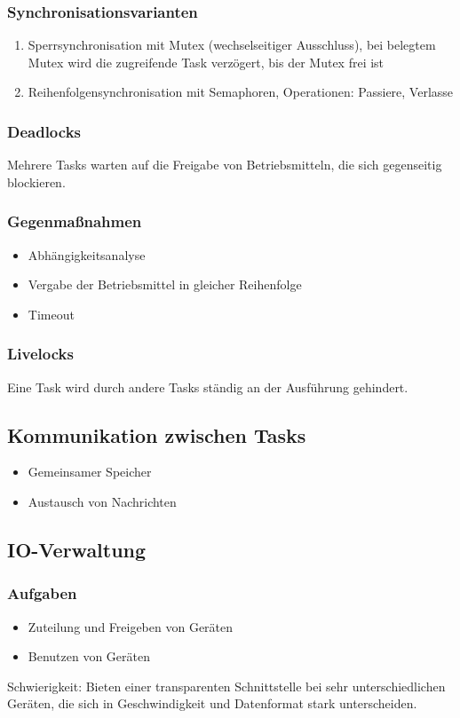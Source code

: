 \subsubsection{Synchronisationsvarianten}
\begin{enumerate}
	\item Sperrsynchronisation mit Mutex (wechselseitiger Ausschluss), bei belegtem Mutex wird die zugreifende Task verzögert, bis der Mutex frei ist
	\item Reihenfolgensynchronisation mit Semaphoren, Operationen: Passiere, Verlasse
\end{enumerate}

\subsubsection{Deadlocks}
Mehrere Tasks warten auf die Freigabe von Betriebsmitteln, die sich gegenseitig blockieren.

\subsubsection{Gegenmaßnahmen}
\begin{itemize}
	\item Abhängigkeitsanalyse
	\item Vergabe der Betriebsmittel in gleicher Reihenfolge
	\item Timeout
\end{itemize}

\subsubsection{Livelocks}
Eine Task wird durch andere Tasks ständig an der Ausführung gehindert.


\subsection{Kommunikation zwischen Tasks}
\begin{itemize}
	\item Gemeinsamer Speicher
	\item Austausch von Nachrichten
\end{itemize}


\subsection{IO-Verwaltung}

\subsubsection{Aufgaben}
\begin{itemize}
	\item Zuteilung und Freigeben von Geräten
	\item Benutzen von Geräten
\end{itemize}
Schwierigkeit: Bieten einer transparenten Schnittstelle bei sehr unterschiedlichen Geräten, die sich in Geschwindigkeit und Datenformat stark unterscheiden.

